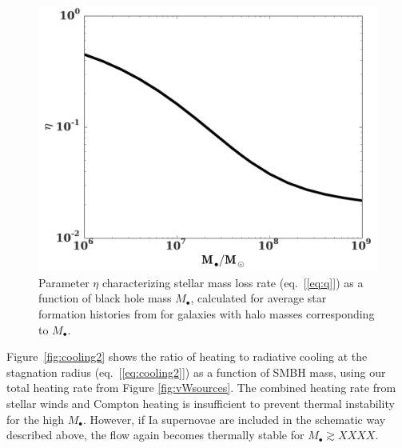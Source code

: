 \documentclass[usenatbib,fleqn]{mn2e}
\newcommand{\rs}{r_s}
\newcommand{\Mbh}[1][]{M_{\bullet#1}}
\newcommand{\vwO}{v_{w}}
\begin{document}
\begin{figure}
\includegraphics[width=\columnwidth]{eta.pdf}
\caption{\label{fig:eta} Parameter  $\eta$ characterizing stellar mass loss rate (eq.~[\ref{eq:q}]) as a function of black hole mass $\Mbh$, calculated for average star formation histories from \citet{MosterNaab+:2013a} for galaxies with halo masses corresponding to $\Mbh$. }
\end{figure}

Figure~\ref{fig:cooling2} shows the ratio of heating to radiative
cooling at the stagnation radius (eq.~[\ref{eq:cooling2}]) as a
function of SMBH mass, using our total heating rate from Figure
\ref{fig:vWsources}.  The combined heating rate from stellar winds and
Compton heating is insufficient to prevent thermal instability for the
high $\Mbh$.  However, if Ia supernovae are included in the schematic
way described above, the flow again becomes thermally stable for $\Mbh
\gtrsim XXXX$.



\end{document}
